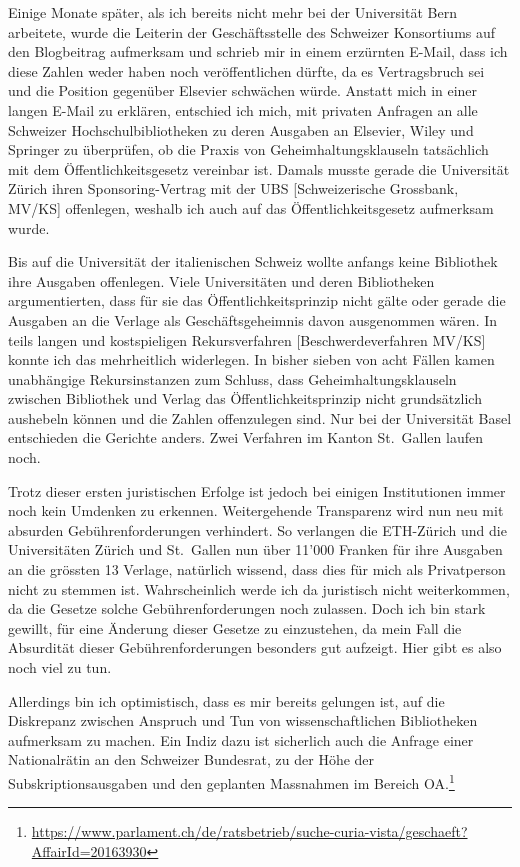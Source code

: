 \documentclass[a4paper,
fontsize=11pt,
oneside,
numbers=noperiodatend,
parskip=half-,
bibliography=totoc,
final
]{scrartcl}
\begin{document}
Einige Monate später, als ich bereits nicht mehr bei der Universität
Bern arbeitete, wurde die Leiterin der Geschäftsstelle des Schweizer
Konsortiums auf den Blogbeitrag aufmerksam und schrieb mir in einem
erzürnten E-Mail, dass ich diese Zahlen weder haben noch veröffentlichen
dürfte, da es Vertragsbruch sei und die Position gegenüber Elsevier
schwächen würde. Anstatt mich in einer langen E-Mail zu erklären,
entschied ich mich, mit privaten Anfragen an alle Schweizer
Hochschulbibliotheken zu deren Ausgaben an Elsevier, Wiley und Springer
zu überprüfen, ob die Praxis von Geheimhaltungsklauseln tatsächlich mit
dem Öffentlichkeitsgesetz vereinbar ist. Damals musste gerade die
Universität Zürich ihren Sponsoring-Vertrag mit der UBS
{[}Schweizerische Grossbank, MV/KS{]} offenlegen, weshalb ich auch auf
das Öffentlichkeitsgesetz aufmerksam wurde.

Bis auf die Universität der italienischen Schweiz wollte anfangs keine
Bibliothek ihre Ausgaben offenlegen. Viele Universitäten und deren
Bibliotheken argumentierten, dass für sie das Öffentlichkeitsprinzip
nicht gälte oder gerade die Ausgaben an die Verlage als
Geschäftsgeheimnis davon ausgenommen wären. In teils langen und
kostspieligen Rekursverfahren {[}Beschwerdeverfahren MV/KS{]} konnte ich
das mehrheitlich widerlegen. In bisher sieben von acht Fällen kamen
unabhängige Rekursinstanzen zum Schluss, dass Geheimhaltungsklauseln
zwischen Bibliothek und Verlag das Öffentlichkeitsprinzip nicht
grundsätzlich aushebeln können und die Zahlen offenzulegen sind. Nur bei
der Universität Basel entschieden die Gerichte anders. Zwei Verfahren im
Kanton St.~Gallen laufen noch.

Trotz dieser ersten juristischen Erfolge ist jedoch bei einigen
Institutionen immer noch kein Umdenken zu erkennen. Weitergehende
Transparenz wird nun neu mit absurden Gebührenforderungen verhindert. So
verlangen die ETH-Zürich und die Universitäten Zürich und St.~Gallen nun
über 11'000 Franken für ihre Ausgaben an die grössten 13 Verlage,
natürlich wissend, dass dies für mich als Privatperson nicht zu stemmen
ist. Wahrscheinlich werde ich da juristisch nicht weiterkommen, da die
Gesetze solche Gebührenforderungen noch zulassen. Doch ich bin stark
gewillt, für eine Änderung dieser Gesetze zu einzustehen, da mein Fall
die Absurdität dieser Gebührenforderungen besonders gut aufzeigt. Hier
gibt es also noch viel zu tun.

Allerdings bin ich optimistisch, dass es mir bereits gelungen ist, auf
die Diskrepanz zwischen Anspruch und Tun von wissenschaftlichen
Bibliotheken aufmerksam zu machen. Ein Indiz dazu ist sicherlich auch
die Anfrage einer Nationalrätin an den Schweizer Bundesrat, zu der Höhe
der Subskriptionsausgaben und den geplanten Massnahmen im Bereich
OA.\footnote{\url{https://www.parlament.ch/de/ratsbetrieb/suche-curia-vista/geschaeft?AffairId=20163930}}
\end{document}
